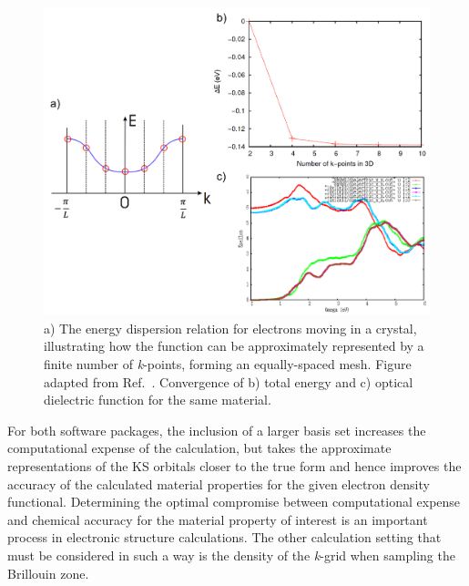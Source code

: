 \documentclass[11pt, twoside]{report}
\begin{document}
\begin{figure}[h!]
  \centering
    \includegraphics[width=1.0\textwidth]{figures/k-point_sampling_update.png}
    \caption[a) The energy dispersion relation for electrons moving in a crystal, illustrating how the function can be approximately represented by a finite number of \textit{k}-points, forming an equally-spaced mesh. b) convergence of total energy and c) optical dielectric function for the same material.]{a) The energy dispersion relation for electrons moving in a crystal, illustrating how the function can be approximately represented by a finite number of \textit{k}-points, forming an equally-spaced mesh. Figure adapted from Ref.~. Convergence of b) total energy and c) optical dielectric function for the same material.}
  \label{k_sampling}
\end{figure}

For both software packages, the inclusion of a larger basis set increases the computational expense of the calculation, but takes the approximate representations of the KS orbitals closer to the true form and hence improves the accuracy of the calculated material properties for the given electron density functional. Determining the optimal compromise between computational expense and chemical accuracy for the material property of interest is an important process in electronic structure calculations. The other calculation setting that must be considered in such a way is the density of the \textit{k}-grid when sampling the Brillouin zone.
\end{document}
